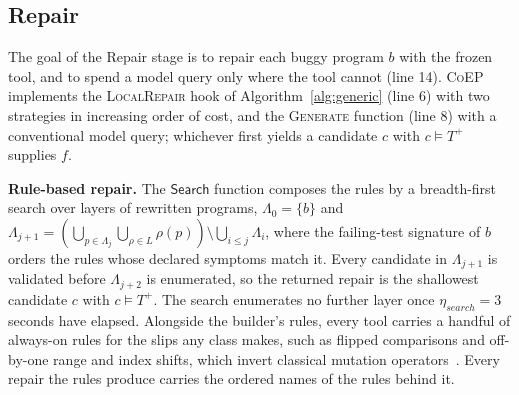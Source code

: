 \documentclass[acmsmall,screen,review,anonymous,nonacm]{acmart}
\newcommand{\tool}{\textsc{CoEP}\xspace}
\newcommand{\Fn}[1]{\textsc{#1}}
\newcommand{\aux}[1]{\ensuremath{\mathsf{#1}}}
\newcommand{\V}[1]{\ensuremath{\mathit{#1}}}
\begin{document}
\subsection{Repair}
\label{sec:repair}

The goal of the Repair stage is to repair each buggy program $b$ with the frozen tool, and to spend a model query only where the tool cannot (line 14). \tool implements the \Fn{LocalRepair} hook of Algorithm~\ref{alg:generic} (line 6) with two strategies in increasing order of cost, and the \Fn{Generate} function (line 8) with a conventional model query; whichever first yields a candidate $c$ with $c \models T^{+}$ supplies $f$.

\textbf{Rule-based repair.} The \aux{Search} function composes the rules by a breadth-first search over layers of rewritten programs, $\Lambda_0 = \{b\}$ and $\Lambda_{j+1} = (\bigcup_{p \in \Lambda_j} \bigcup_{\rho \in L} \rho(p)) \setminus \bigcup_{i \le j} \Lambda_i$, where the failing-test signature of $b$ orders the rules whose declared symptoms match it. Every candidate in $\Lambda_{j+1}$ is validated before $\Lambda_{j+2}$ is enumerated, so the returned repair is the shallowest candidate $c$ with $c \models T^{+}$. The search enumerates no further layer once $\eta_{\V{search}} = 3$ seconds have elapsed. Alongside the builder's rules, every tool carries a handful of always-on rules for the slips any class makes, such as flipped comparisons and off-by-one range and index shifts, which invert classical mutation operators~\cite{just2014mutants,kim2013automatic,liu2019tbar}. Every repair the rules produce carries the ordered names of the rules behind it.
\end{document}
